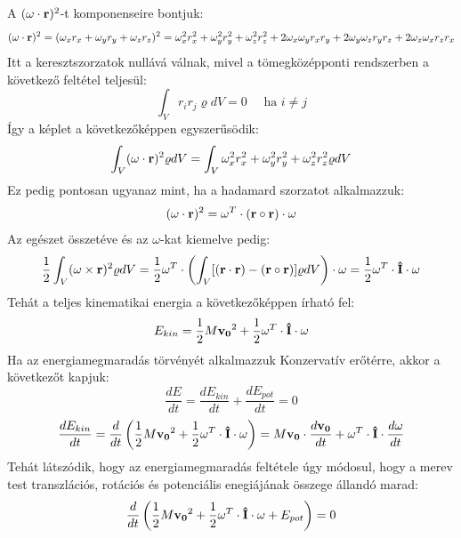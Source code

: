 \documentclass[a4paper,12pt]{article}
\begin{document}
A $(\bold{\omega} \cdot \bold{r})^2$-t komponenseire bontjuk:
\begin{equation}
    (\bold{\omega} \cdot \bold{r})^2 = (\omega_x r_x + \omega_y r_y + \omega_z r_z)^2 = \omega_x^2 r_x^2 + \omega_y^2 r_y^2 + \omega_z^2 r_z^2 + 2 \omega_x \omega_y r_x r_y + 2 \omega_y \omega_z r_y r_z + 2 \omega_z \omega_x r_z r_x
\end{equation}
Itt a keresztszorzatok nullává válnak, mivel a tömegközépponti rendszerben a következő feltétel teljesül:
\begin{equation}
    \int_{V} r_i r_j \varrho dV = 0 \quad \text{ ha } i \neq j
\end{equation}
Így a képlet a következőképpen egyszerűsödik:
\begin{equation}
    \int_{V} (\bold{\omega} \cdot \bold{r})^2 \varrho dV = \int_{V}\omega_x^2 r_x^2 + \omega_y^2 r_y^2 + \omega_z^2 r_z^2 \varrho dV
\end{equation}
Ez pedig pontosan ugyanaz mint, ha a hadamard szorzatot alkalmazzuk:
\begin{equation}
    (\bold{\omega} \cdot \bold{r})^2 = \omega^T \cdot (\bold{r} \circ \bold{r}) \cdot \omega
\end{equation}
Az egészet összetéve és az $\omega$-kat kiemelve pedig:
\begin{equation}
    \frac{1}{2} \int_{V} (\bold{\omega} \times \bold{r})^2 \varrho dV = \frac{1}{2} \omega^T \cdot \left(\int_{V} [(\bold{r} \cdot \bold{r}) - (\bold{r} \circ \bold{r})] \varrho dV\right) \cdot \omega = \frac{1}{2} \omega^T \cdot \bold{\hat{I}} \cdot \omega
\end{equation}
Tehát a teljes kinematikai energia a következőképpen írható fel:
\begin{equation}    
    E_{kin} = \frac{1}{2} M \bold{v_0}^2 + \frac{1}{2} \bold{\omega}^T \cdot \bold{\hat{I}} \cdot \bold{\omega}
\end{equation}
Ha az energiamegmaradás törvényét alkalmazzuk Konzervatív erőtérre, akkor a következőt kapjuk:
\begin{equation}
    \frac{dE}{dt} = \frac{dE_{kin}}{dt} + \frac{dE_{pot}}{dt} = 0
\end{equation}
\begin{equation}
    \frac{dE_{kin}}{dt} = \frac{d}{dt} \left(\frac{1}{2} M \bold{v_0}^2 + \frac{1}{2} \bold{\omega}^T \cdot \bold{\hat{I}} \cdot \bold{\omega}\right) = M \bold{v_0} \cdot \frac{d\bold{v_0}}{dt} + \bold{\omega}^T \cdot \bold{\hat{I}} \cdot \frac{d\bold{\omega}}{dt}
\end{equation}
Tehát látszódik, hogy az energiamegmaradás feltétele úgy módosul, hogy a merev test transzlációs, rotációs és potenciális enegiájának összege állandó marad:
\begin{equation}
    \frac{d}{dt} \left(\frac{1}{2} M \bold{v_0}^2 + \frac{1}{2} \bold{\omega}^T \cdot \bold{\hat{I}} \cdot \bold{\omega} + E_{pot}\right) = 0
\end{equation}
\end{document}
